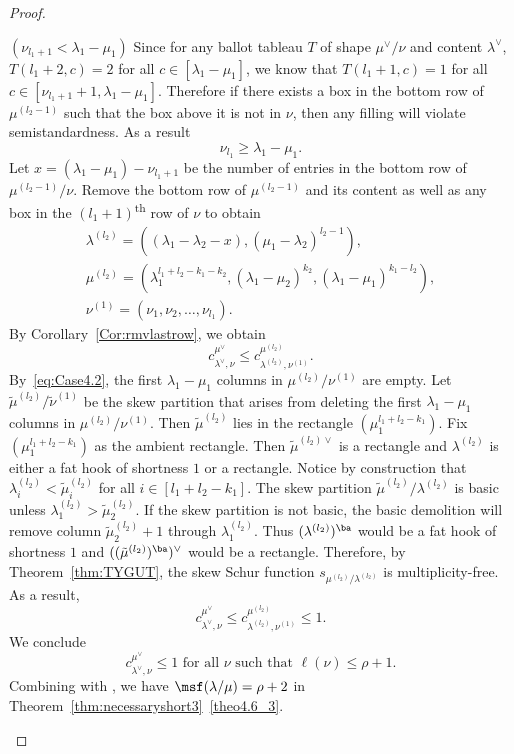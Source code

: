 \begin{proof}
\begin{Case}
{ $(\nu_{l_1+1} < \lambda_1-\mu_1)$} 
Since for any ballot tableau $T$ of shape $\mu^\vee/\nu$ and content $\lambda^\vee$, $T(l_1+2,c) = 2$ for all $c\in [\lambda_1-\mu_1]$, we know that $T(l_1+1,c) = 1$ for all $c\in [\nu_{l_1+1}+1,\lambda_1-\mu_1]$. Therefore if there exists a box in the bottom row of $\mu^{(l_2-1)}$ such that the box above it is not in $\nu$, then any filling will violate semistandardness. As a result
\begin{equation}
\label{eq:Case4.2}
 \nu_{l_1}\geq \lambda_1-\mu_1.
\end{equation}
Let $x = (\lambda_1-\mu_1)-\nu_{l_1+1}$ be the number of entries in the bottom row of $\mu^{(l_2-1)}/\nu$. Remove the bottom row of $\mu^{(l_2-1)}$ and its content as well as any box in the $(l_1+1)$\textsuperscript{th} row of $\nu$ to obtain
\[\begin{gathered}
\lambda^{(l_2)} = ((\lambda_1-\lambda_2-x),(\mu_1-\lambda_2)^{l_2-1}),
\\
\mu^{(l_2)} = (\lambda_1^{l_1+l_2-k_1-k_2}, (\lambda_1-\mu_2)^{k_2},(\lambda_1-\mu_1)^{k_1-l_2}),
\\
\nu^{(1)} = (\nu_1,\nu_2,\ldots,\nu_{l_1}).
\end{gathered}
\]
By Corollary~\ref{Cor:rmvlastrow}, we obtain
\[
c^{\mu^\vee}_{\lambda^\vee,\nu}\leq c^{\mu^{(l_2)}}_{\lambda^{(l_2)},\nu^{(1)}}.
\]
By~\eqref{eq:Case4.2}, the first $\lambda_1-\mu_1$ columns in $\mu^{(l_2)}/\nu^{(1)}$ are empty. Let $\tilde\mu^{(l_2)}/\tilde\nu^{(1)}$ be the skew partition that arises from deleting the first $\lambda_1-\mu_1$ columns in $\mu^{(l_2)}/\nu^{(1)}$.
Then $\tilde\mu^{(l_2)}$ lies in the rectangle $(\mu_1^{l_1+l_2-k_1})$. Fix $(\mu_1^{l_1+l_2-k_1})$ as the ambient rectangle. Then $\tilde\mu^{(l_2)\vee}$ is a rectangle and $\lambda^{(l_2)}$ is either a fat hook of shortness $1$ or a rectangle. Notice by construction that $\lambda^{(l_2)}_{i}< \tilde\mu^{(l_2)}_i$ for all $i\in [l_1+l_2-k_1]$. The skew partition $\tilde\mu^{(l_2)}/\lambda^{(l_2)}$ is basic unless $\lambda^{(l_2)}_1> \tilde\mu^{(l_2)}_2$. If the skew partition is not basic, the basic demolition will remove column $\tilde\mu^{(l_2)}_2+1$ through $\lambda^{(l_2)}_1$. Thus $(\lambda^{(l_2)})^{\ba }$ would be a fat hook of shortness $1$ and $((\tilde\mu^{(l_2)})^{\ba })^\vee$ would be a rectangle. 
Therefore, by Theorem~\ref{thm:TYGUT}, the skew Schur function $s_{\mu^{(l_2)}/\lambda^{(l_2)}}$ is multiplicity-free. As a result,
\[
c^{\mu^\vee}_{\lambda^\vee,\nu} \leq c^{ \mu^{(l_2)}}_{\lambda^{(l_2)},\nu^{(1)}} \leq 1.
\]
We conclude
\[
c^{\mu^\vee}_{\lambda^\vee,\nu} \leq 1 \text{ for all }\nu\text{ such that }\ell(\nu)\leq \rho+1.
\]
Combining  with , we have ${\msf }(\lambda/\mu) = \rho+2$ in Theorem~\ref{thm:necessaryshort3}~\ref{theo4.6_3}.\qedhere
\end{Case}
\end{proof}


